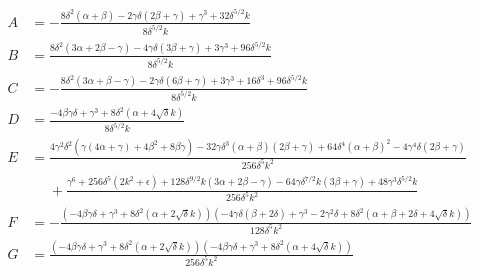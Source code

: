 \documentclass[reprint, amsmath, amssymb, aps, prl]{revtex4-2}
\begin{document}
    \begin{widetext}
    \begin{equation*}
    \begin{split}
        A&=-\frac{8 \delta ^2 (\alpha +\beta )-2 \gamma  \delta  (2 \beta +\gamma )+\gamma ^3+32 \delta ^{5/2} k}{8 \delta ^{5/2} k}\\
        B&= \frac{8 \delta ^2 (3 \alpha +2 \beta -\gamma )-4 \gamma  \delta  (3 \beta +\gamma )+3 \gamma ^3+96 \delta ^{5/2} k}{8 \delta ^{5/2} k}\\
        C&= -\frac{8 \delta ^2 (3 \alpha +\beta -\gamma )-2 \gamma  \delta  (6 \beta +\gamma )+3 \gamma ^3+16 \delta ^3+96 \delta ^{5/2} k}{8 \delta ^{5/2} k}\\
        D&= \frac{-4 \beta  \gamma  \delta +\gamma ^3+8 \delta ^2 \left(\alpha +4 \sqrt{\delta } k\right)}{8 \delta ^{5/2} k}\\
        E&= \frac{4 \gamma ^2 \delta ^2 \left(\gamma  (4 \alpha +\gamma )+4 \beta ^2+8 \beta  \gamma \right)-32 \gamma  \delta ^3 (\alpha +\beta ) (2 \beta +\gamma )+64 \delta ^4 (\alpha +\beta )^2-4 \gamma ^4 \delta  (2 \beta +\gamma )}{256 \delta ^5 k^2}\\
       &\ \ \ \ \ \  +\frac{\gamma ^6+256 \delta ^5 \left(2 k^2+\epsilon \right)+128 \delta ^{9/2} k (3 \alpha +2 \beta -\gamma )-64 \gamma  \delta ^{7/2} k (3 \beta +\gamma )+48 \gamma ^3 \delta ^{5/2} k}{256 \delta ^5 k^2}\\
        F&= -\frac{\left(-4 \beta  \gamma  \delta +\gamma ^3+8 \delta ^2 \left(\alpha +2 \sqrt{\delta } k\right)\right) \left(-4 \gamma  \delta  (\beta +2 \delta )+\gamma ^3-2 \gamma ^2 \delta +8 \delta ^2 \left(\alpha +\beta +2 \delta +4 \sqrt{\delta } k\right)\right)}{128 \delta ^5 k^2}\\
        G&= \frac{\left(-4 \beta  \gamma  \delta +\gamma ^3+8 \delta ^2 \left(\alpha +2 \sqrt{\delta } k\right)\right) \left(-4 \beta  \gamma  \delta +\gamma ^3+8 \delta ^2 \left(\alpha +4 \sqrt{\delta } k\right)\right)}{256 \delta ^5 k^2}
    \end{split}
    \end{equation*}
    \end{widetext}

\nocite{*}

\end{document}
